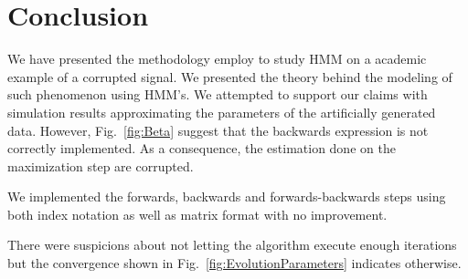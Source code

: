 \documentclass[letterpaper, 10 pt, conference]{ieeeconf}  %
\begin{document}

\section{Conclusion}
\label{sec:Conclusion}

We have presented the methodology employ to study HMM on a academic example of a corrupted signal. We presented the theory behind the modeling 
of such phenomenon using HMM's. We attempted to support our claims with simulation results approximating the parameters of the artificially generated
data. However,  Fig.~\ref{fig:Beta} suggest that the backwards expression is not correctly implemented.  As a consequence, the estimation done on the
maximization step are corrupted.

We implemented the forwards, backwards and forwards-backwards steps using both index notation as well as matrix format with no improvement.

There were suspicions about not letting the algorithm execute enough iterations but the convergence shown in Fig.~\ref{fig:EvolutionParameters} indicates 
otherwise.
 









\end{document}
